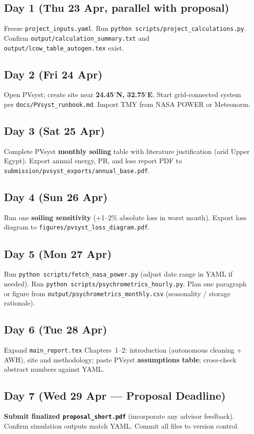 \documentclass[11pt,a4paper]{article}
\begin{document}
\subsection{Day 1 (Thu 23 Apr, parallel with proposal)}
Freeze \texttt{project\_inputs.yaml}. Run \texttt{python scripts/project\_calculations.py}. Confirm \texttt{output/calculation\_summary.txt} and \texttt{output/lcow\_table\_autogen.tex} exist.

\subsection{Day 2 (Fri 24 Apr)}
Open PVsyst; create site near \textbf{24.45$^\circ$N, 32.75$^\circ$E}. Start grid-connected system per \texttt{docs/PVsyst\_runbook.md}. Import TMY from NASA POWER or Meteonorm.

\subsection{Day 3 (Sat 25 Apr)}
Complete PVsyst \textbf{monthly soiling} table with literature justification (arid Upper Egypt). Export annual energy, PR, and loss report PDF to \texttt{submission/pvsyst\_exports/annual\_base.pdf}.

\subsection{Day 4 (Sun 26 Apr)}
Run one \textbf{soiling sensitivity} (+1--2\% absolute loss in worst month). Export loss diagram to \texttt{figures/pvsyst\_loss\_diagram.pdf}.

\subsection{Day 5 (Mon 27 Apr)}
Run \texttt{python scripts/fetch\_nasa\_power.py} (adjust date range in YAML if needed). Run \texttt{python scripts/psychrometrics\_hourly.py}. Plan one paragraph or figure from \texttt{output/psychrometrics\_monthly.csv} (seasonality / storage rationale).

\subsection{Day 6 (Tue 28 Apr)}
Expand \texttt{main\_report.tex} Chapters~1--2: introduction (autonomous cleaning + AWH), site and methodology; paste PVsyst \textbf{assumptions table}; cross-check abstract numbers against YAML.

\subsection{Day 7 (Wed 29 Apr --- Proposal Deadline)}
\textbf{Submit finalized \texttt{proposal\_short.pdf}} (incorporate any advisor feedback). Confirm simulation outputs match YAML. Commit all files to version control.
\end{document}
